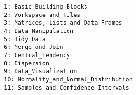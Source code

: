 \documentclass[12pt,article]{article}
\begin{document}
\large
\begin{verbatim}
1: Basic Building Blocks
2: Workspace and Files
3: Matrices, Lists and Data Frames
4: Data Manipulation
5: Tidy Data
6: Merge and Join
7: Central_Tendency
8: Dispersion
9: Data_Visualization
10: Normality_and_Normal_Distribution
11: Samples_and_Confidence_Intervals
\end{verbatim}
\end{document}
